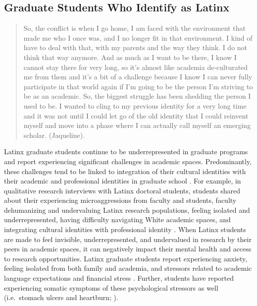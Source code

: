 \documentclass[
  11pt,
]{book}
\begin{document}
\subsection{Graduate Students Who Identify as Latinx}\label{graduate-students-who-identify-as-latinx}

\begin{quote}
So, the conflict is when I go home, I am faced with the environment that made me who I once was, and I no longer fit in that environment. I kind of have to deal with that, with my parents and the way they think. I do not think that way anymore. And as much as I want to be there, I know I cannot stay there for very long, so it's almost like academia de-culturated me from them and it's a bit of a challenge because I know I can never fully participate in that world again if I'm going to be the person I'm striving to be as an academic. So, the biggest struggle has been shedding the person I used to be. I wanted to cling to my previous identity for a very long time and it was not until I could let go of the old identity that I could reinvent myself and move into a phase where I can actually call myself an emerging scholar. (Jaqueline). \citep[p.~383]{ramos_conociendo_2020}
\end{quote}

Latinx graduate students continue to be underrepresented in graduate programs and report experiencing significant challenges in academic spaces. Predominantly, these challenges tend to be linked to integration of their cultural identities with their academic and professional identities in graduate school \citep{crumb_fostering_2022, locke_counterstory_2022, ramos_conociendo_2020}. For example, in qualitative research interviews with Latinx doctoral students, students shared about their experiencing microaggressions from faculty and students, faculty dehumanizing and undervaluing Latinx research populations, feeling isolated and underrepresented, having difficulty navigating White academic spaces, and integrating cultural identities with professional identity \citep{crumb_fostering_2022, ramos_conociendo_2020}. When Latinx students are made to feel invisible, underrepresented, and undervalued in research by their peers in academic spaces, it can negatively impact their mental health and access to research opportunities. Latinx graduate students report experiencing anxiety, feeling isolated from both family and academia, and stressors related to academic language expectations and financial stress \citep{crumb_fostering_2022, locke_counterstory_2022, ramos_conociendo_2020}. Further, students have reported experiencing somatic symptoms of these psychological stressors as well (i.e.~stomach ulcers and heartburn; \citet{ramos_conociendo_2020}).
\end{document}
